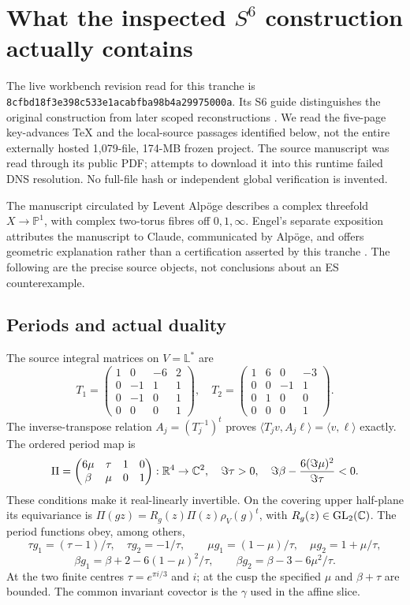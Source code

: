 \section{What the inspected $S^6$ construction actually contains}
The live workbench revision read for this tranche is
{\small\texttt{8cfbd18f3e398c533e1acabfba98b4a29975000a}}. Its S6 guide distinguishes
the original construction from later scoped reconstructions
\cite{s6repo}. We read the five-page key-advances TeX and the local-source
passages identified below, not the entire externally hosted 1,079-file,
174-MB frozen project. The source manuscript was read through its public
PDF; attempts to download it into this runtime failed DNS resolution.
No full-file hash or independent global verification is invented.

The manuscript circulated by Levent Alp\"oge describes a complex
threefold $X\to\mathbb P^1$, with complex two-torus fibres off
$0,1,\infty$. Engel's separate exposition attributes the manuscript to
Claude, communicated by Alp\"oge, and offers geometric explanation rather
than a certification asserted by this tranche \cite{source,engel}.
The following are the precise source objects, not conclusions about an
ES counterexample.

\subsection{Periods and actual duality}
The source integral matrices on $V=\mathbb L^*$ are
\[
 T_1=\begin{pmatrix}1&0&-6&2\\0&-1&1&1\\0&-1&0&1\\0&0&0&1\end{pmatrix},\quad
 T_2=\begin{pmatrix}1&6&0&-3\\0&0&-1&1\\0&1&0&0\\0&0&0&1\end{pmatrix}.
\]
The inverse-transpose relation $A_j=(T_j^{-1})^t$ proves
$\langle T_jv,A_j\ell\rangle=\langle v,\ell\rangle$ exactly.
The ordered period map is
\[
 \Pi=\begin{pmatrix}6\mu&\tau&1&0\\\beta&\mu&0&1\end{pmatrix}:\mathbb R^4\to\mathbb C^2,
 \quad \Im\tau>0,\quad
 \Im\beta-\frac{6(\Im\mu)^2}{\Im\tau}<0.
\]
These conditions make it real-linearly invertible. On the covering upper
half-plane its equivariance is
$\Pi(gz)=R_g(z)\Pi(z)\rho_V(g)^t$, with $R_g(z)\in\mathrm{GL}_2(\mathbb C)$.
The period functions obey, among others,
\[
 \tau g_1=(\tau-1)/\tau,\quad \tau g_2=-1/\tau,
 \qquad \mu g_1=(1-\mu)/\tau,\quad\mu g_2=1+\mu/\tau,
\]
\[
 \beta g_1=\beta+2-6(1-\mu)^2/\tau,\qquad
 \beta g_2=\beta-3-6\mu^2/\tau.
\]
At the two finite centres $\tau=e^{\pi i/3}$ and $i$; at the cusp the
specified $\mu$ and $\beta+\tau$ are bounded.
The common invariant covector is the $\gamma$ used in the affine slice.

